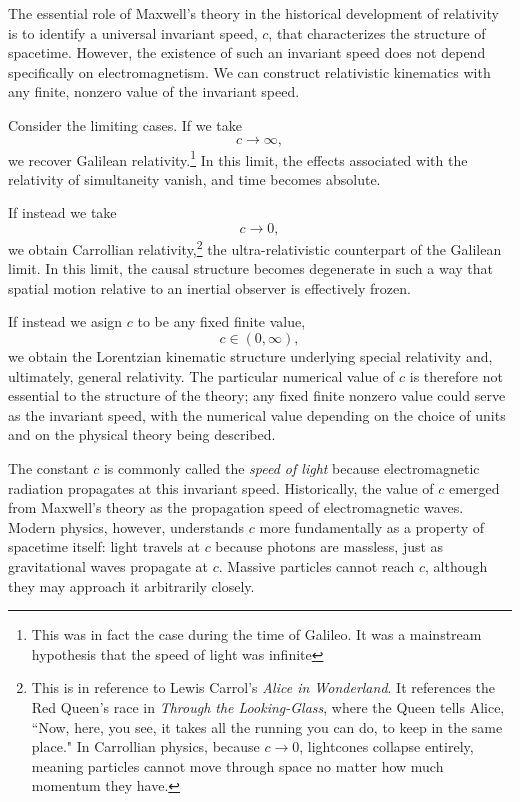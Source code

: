 
		The essential role of Maxwell's theory in the historical development of
		relativity is to identify a universal invariant speed, $c$, that characterizes
		the structure of spacetime. However, the existence of such an invariant speed
		does not depend specifically on electromagnetism. We can construct relativistic
		kinematics with any finite, nonzero value of the invariant speed.

		Consider the limiting cases. If we take
		\[
			c \to \infty,
		\]
		we recover Galilean relativity.\footnote{This was in fact the case during the time of Galileo. It was a mainstream hypothesis that the speed of light was infinite}
		In this limit, the effects associated with the
		relativity of simultaneity vanish, and time becomes absolute.

		If instead we take
		\[
			c \to 0,
		\]
		we obtain Carrollian relativity,\footnote{This is in reference to Lewis Carrol's \textit{Alice in Wonderland}. It references the Red Queen's race in \textit{Through the Looking-Glass}, where the Queen tells Alice, ``Now, here, you see, it takes all the running you can do, to keep in the same place." In Carrollian physics, because $c\to0$, lightcones collapse entirely, meaning particles cannot move through space no matter how much momentum they have.}
		the ultra-relativistic counterpart of the
		Galilean limit. In this limit, the causal structure becomes degenerate in such
		a way that spatial motion relative to an inertial observer is effectively
		frozen.

		If instead we asign $c$ to be any fixed finite value,
		\[
			c \in (0,\infty),
		\]
		we obtain the Lorentzian kinematic structure underlying special relativity
		and, ultimately, general relativity. The particular numerical value of $c$
		is therefore not essential to the structure of the theory; any fixed finite
		nonzero value could serve as the invariant speed, with the numerical value
		depending on the choice of units and on the physical theory being described.

		The constant $c$ is commonly called the \textit{speed of light} because electromagnetic
		radiation propagates at this invariant speed. Historically, the value of $c$
		emerged from Maxwell's theory as the propagation speed of electromagnetic
		waves. Modern physics, however, understands $c$ more fundamentally as a
		property of spacetime itself: light travels at $c$ because photons are
		massless, just as gravitational waves propagate at $c$. Massive particles
		cannot reach $c$, although they may approach it arbitrarily closely.

